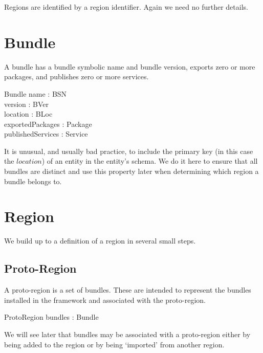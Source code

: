 \documentclass[a4paper,9pt]{article}
\begin{document}
Regions are identified by a region identifier. Again we need no further details.
\begin{zed}
  [RId]
\end{zed}

\clearpage
\section{Bundle}
\label{cha:bundle}

A bundle has a bundle symbolic name and bundle version, exports zero or more packages, and
publishes zero or more services.

\begin{schema}{Bundle}
  name : BSN \\
  version : BVer \\
  location : BLoc \\
  exportedPackages : \power Package \\
  publishedServices : \power Service \\
\end{schema}
It is unusual, and usually bad practice, to include the primary key (in this case the $location$) of
an entity in the entity's schema.
We do it here to ensure that all bundles are
distinct and use this property later when determining which region a bundle belongs to.

\clearpage
\section{Region}
\label{cha:region}

We build up to a definition of a region in several small steps.

\subsection{Proto-Region}

A proto-region is a set of bundles.
These are intended to represent the bundles installed in the framework and associated with the proto-region.
\begin{schema}{ProtoRegion}
  bundles : \power Bundle \\
\end{schema}
We will see later that bundles may be associated with a proto-region either by being added to the region or by
being `imported' from another region.
\end{document}
